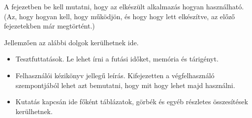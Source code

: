 
A fejezetben be kell mutatni, hogy az elkészült alkalmazás hogyan használható.
(Az, hogy hogyan kell, hogy működjön, és hogy hogy lett elkészítve, az előző fejezetekben már megtörtént.)

Jellemzően az alábbi dolgok kerülhetnek ide.
\begin{itemize}
\item Tesztfuttatások. Le lehet írni a futási időket, memória és tárigényt.
\item Felhasználói kézikönyv jellegű leírás. Kifejezetten a végfelhasználó szempontjából lehet azt bemutatni, hogy mit hogy lehet majd használni.
\item Kutatás kapcsán ide főként táblázatok, görbék és egyéb részletes összesítések kerülhetnek.
\end{itemize}
